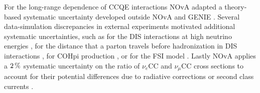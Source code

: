 




For the long-range dependence of \gls{CC}\gls{QE} interactions \gls{NOvA} adapted a theory-based systematic uncertainty developed outside \gls{NOvA} and GENIE \cite{TheoreticalCCQERPAUncertainty2006.pdf, ImplementationOfCCQERPAUncertaintyMINERvA2017.pdf}. Several data-simulation discrepancies in external experiments motivated additional systematic uncertainties, such as for the \gls{DIS} interactions at high neutrino energies \cite{DISSystematicMeasurementsNuTeV2006.pdf}, for the distance that a parton travels before hadronization in \gls{DIS} interactions \cite{DISFormationZoneSystMINOS2006.pdf}, for \gls{COHpi} production \cite{COHPiProdSystMINERvA2018.pdf}, or for the \gls{FSI} model \cite{FSISystNEUTResults2019.pdf}. Lastly \gls{NOvA} applies a $\unit[2]{\%}$ systematic uncertainty on the ratio of $\nu_e$\gls{CC} and $\nu_\mu$\gls{CC} cross sections to account for their potential differences due to radiative corrections or second class currents \cite{NuToAntinuSystematicT2K2017.pdf}.

